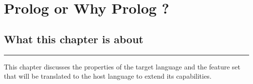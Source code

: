 \documentclass[thesis-solanki.tex]{subfiles}
\begin{document}
\chapter{Prolog or Why Prolog ?}\label{chap:pwp}


\section{What this chapter is about}

\noindent\rule{\textwidth}{0.5pt}

This chapter discusses the properties of the target language  and the feature set that will be translated to the host 
language to extend its capabilities.
\end{document}
